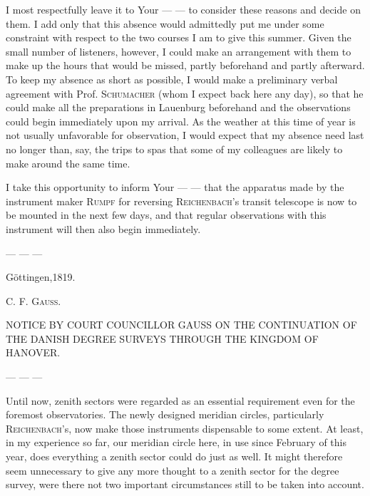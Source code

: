 \par
{}%
I most respectfully leave it to Your — — to consider these reasons and decide on them. I add only that this absence would admittedly put me under some constraint with respect to the two courses I am to give this summer. Given the small number of listeners, however, I could make an arrangement with them to make up the hours that would be missed, partly beforehand and partly afterward. To keep my absence as short as possible, I would make a preliminary verbal agreement with Prof. \textsc{Schumacher} (whom I expect back here any day), so that he could make all the preparations in Lauenburg beforehand and the observations could begin immediately upon my arrival. As the weather at this time of year is not usually unfavorable for observation, I would expect that my absence need last no longer than, say, the trips to spas that some of my colleagues are likely to make around the same time.

I take this opportunity to inform Your — — that the apparatus made by the instrument maker \textsc{Rumpf} for reversing \textsc{Reichenbach}’s transit telescope is now to be mounted in the next few days, and that regular observations with this instrument will then also begin immediately.
\par\nopagebreak[4]
— — —
\par\nopagebreak[4]
Göttingen,\hspace{3em}1819.
\begin{flushright}C. F. \textsc{Gauss}.\end{flushright}

\par\bigskip
{}
\begin{center}\large NOTICE BY COURT COUNCILLOR GAUSS ON THE CONTINUATION OF THE DANISH DEGREE SURVEYS THROUGH THE KINGDOM OF HANOVER.\end{center}
\par
— — —

Until now, zenith sectors were regarded as an essential requirement even for the foremost observatories. The newly designed meridian circles, particularly \textsc{Reichenbach}’s, now make those instruments dispensable to some extent. At least, in my experience so far, our meridian circle here, in use since February of this year, does everything a zenith sector could do just as well. It might therefore seem unnecessary to give any more thought to a zenith sector for the degree survey, were there not two important circumstances still to be taken into account.

